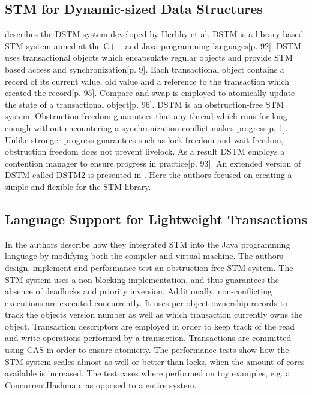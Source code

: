 \subsection{\ac{STM} for Dynamic-sized Data Structures}
\cite{herlihy2003software} describes the DSTM system developed by Herlihy et al. DSTM is a library based \ac{STM} system aimed at the C++ and Java programming languages\cite{herlihy2003software}[p. 92]. DSTM uses transactional objects which encapsulate regular objects and provide \ac{STM} based access and synchronization\cite{herlihy2003software}[p. 9]. Each transactional object contains a record of its current value, old value and a reference to the transaction which created the record\cite{herlihy2003software}[p. 95]. Compare and swap is employed to atomically update the state of a transactional object\cite{herlihy2003software}[p. 96]. DSTM is an obstruction-free\cite{herlihy2003obstruction} \ac{STM} system. Obstruction freedom guarantees that any thread which runs for long enough without encountering a synchronization conflict makes progress\cite{herlihy2003obstruction}[p. 1]. Unlike stronger progress guarantees such as lock-freedom and wait-freedom, obstruction freedom does not prevent livelock\cite[p. 47]{harris2010transactional}. As a result DSTM employs a contention manager to ensure progress in practice\cite{herlihy2003software}[p. 93]. An extended version of DSTM called DSTM2 is presented in \cite{herlihy2006flexible}. Here the authors focused on creating a simple and flexible  for the \ac{STM} library.

\subsection{Language Support for Lightweight Transactions}
In \cite{harris2003language} the authors describe how they integrated \ac{STM} into the Java programming language by modifying both the compiler\cite[p. 4]{harris2003language} and virtual machine\cite[p. 9]{harris2003language}. The authors design, implement and performance test an obstruction free \ac{STM} system. The \ac{STM} system uses a non-blocking implementation, and thus guarantees the absence of deadlocks and priority inversion. Additionally, non-conflicting executions are executed concurrently. It uses per object ownership records to track the objects version number as well as which transaction currently owns the object\cite[p. 6]{harris2003language}. Transaction descriptors are employed in order to keep track of the read and write operations performed by a transaction. Transactions are committed  using \ac{CAS} in order to ensure atomicity\cite[p. 7]{harris2003language}. The performance tests show how the \ac{STM} system scales almost as well or better than locks, when the amount of cores available is increased\cite[p. 12]{harris2003language}. The test cases where performed on toy examples, e.g. a ConcurrentHashmap, as opposed to a entire system.

